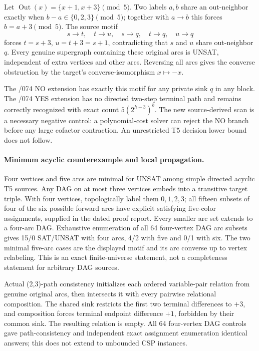 \documentclass[11pt]{article}
\begin{document}
Let $\operatorname{Out}(x)=\{x+1,x+3\}\pmod5$.
Two labels $a,b$ share an out-neighbor exactly when
$b-a\in\{0,2,3\}\pmod5$; together with $a\to b$ this
forces $b=a+3\pmod5$.
The source motif
\[
s\to t,\quad t\to u,\quad
s\to q,\quad t\to q,\quad u\to q
\]
forces $t=s+3$, $u=t+3=s+1$, contradicting that
$s$ and $u$ share out-neighbor $q$.
Every genuine supergraph containing these original arcs is
UNSAT, independent of extra vertices and other arcs.
Reversing all arcs gives the converse obstruction by the
target's converse-isomorphism $x\mapsto-x$.

The /074 NO extension has exactly this motif for any private
sink $q$ in any block. The /074 YES extension has no
directed two-step terminal path and remains correctly
recognized with exact count $5(2^{h-3})^b$.
The new source-derived scan is a necessary negative control:
a polynomial-cost solver can reject the NO branch before any
large cofactor contraction. An unrestricted T5 decision
lower bound does not follow.

\paragraph{Minimum acyclic counterexample and local propagation.}
Four vertices and five arcs are minimal for UNSAT among simple
directed acyclic T5 sources. Any DAG on at most three vertices
embeds into a transitive target triple. With four vertices,
topologically label them $0,1,2,3$; all fifteen subsets of four
of the six possible forward arcs have explicit satisfying
five-color assignments, supplied in the dated proof report.
Every smaller arc set extends to a four-arc DAG. Exhaustive
enumeration of all 64 four-vertex DAG arc subsets gives
15/0 SAT/UNSAT with four arcs, 4/2 with five and 0/1 with six.
The two minimal five-arc cases are the displayed motif and
its arc converse up to vertex relabeling. This is an exact
finite-universe statement, not a completeness statement for
arbitrary DAG sources.

Actual (2,3)-path consistency initializes each ordered
variable-pair relation from genuine original arcs, then
intersects it with every pairwise relational composition.
The shared sink restricts the first two terminal differences
to $+3$, and composition forces terminal endpoint difference
$+1$, forbidden by their common sink. The resulting relation
is empty. All 64 four-vertex DAG controls gave path-consistency
and independent exact assignment enumeration identical answers;
this does not extend to unbounded CSP instances.
\end{document}
